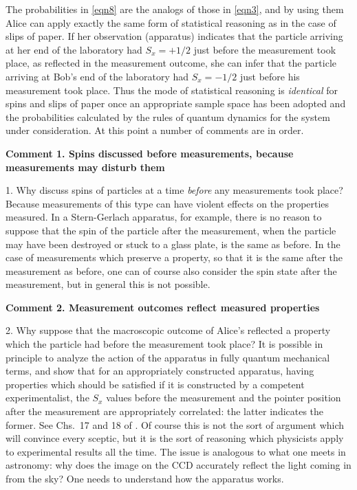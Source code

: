 \documentclass[10pt]{article} %
\def\outl#1{\par{\medskip\noindent\hspace*{.5cm}\bf
      \mathversion{bold}#1\mathversion{normal}\smallskip} }
\def\np{} \def\xa{} \def\xb{} \def\xn{} \def\xp{}
\def\outl#1{} \def\np{} \def\xa{} \def\xb{} \def\xn{} \def\xp{}
\def\outl#1{\par{\medskip\noindent\hspace*{.5cm}\bf
      \mathversion{bold}#1\mathversion{normal}\smallskip} }
\def\np{\newpage }\def\xn{\nopagebreak }\def\xp{\pagebreak }
\begin{document}
The probabilities in \eqref{eqn8} are the analogs of those in \eqref{eqn3},
and by using them Alice can apply exactly the same form of statistical
reasoning as in the case of slips of paper.  If her observation (apparatus)
indicates that the particle arriving at her end of the laboratory had $S_x =
+1/2$ just before the measurement took place, as reflected in the measurement
outcome, she can infer that the particle arriving at Bob's end of the
laboratory had $S_x =-1/2$ just before his measurement took place. Thus the
mode of statistical reasoning is \emph{identical} for spins and slips of paper
once an appropriate sample space has been adopted and the probabilities
calculated by the rules of quantum dynamics for the system under
consideration.
%
At this point a number of comments are in order.

\xb
\outl{Comment 1. Spins discussed before measurements, because measurements may
  disturb them}
\xa


1. Why discuss spins of particles at a time \emph{before} any
measurements took place?  Because measurements of this type can have violent
effects on the properties measured.  In a Stern-Gerlach apparatus, for
example, there is no reason to suppose that the spin of the particle after the
measurement, when the particle may have been destroyed or stuck to a glass
plate, is the same as before.  In the case of measurements which preserve
a property, so that it is the same after the measurement as before, one can of
course also consider the spin state after the measurement, but in general this
is not possible.

\xb
\outl{Comment 2. Measurement outcomes reflect measured properties}
\xa



2. Why suppose that the macroscopic outcome of Alice's reflected a property
which the particle had before the measurement took place?  It is possible in
principle to analyze the action of the apparatus in fully quantum mechanical
terms, and show that for an appropriately constructed apparatus, having
properties which should be satisfied if it is constructed by a competent
experimentalist, the $S_x$ values before the measurement and the pointer
position after the measurement are appropriately correlated: the latter
indicates the former.  See Chs.~17 and 18 of \cite{Grff02c}. Of course this is
not the sort of argument which will convince every sceptic, but it is the sort
of reasoning which physicists apply to experimental results all the time.  The
issue is analogous to what one meets in astronomy: why does the image on the
CCD accurately reflect the light coming in from the sky?  One needs to
understand how the apparatus works.
\end{document}
